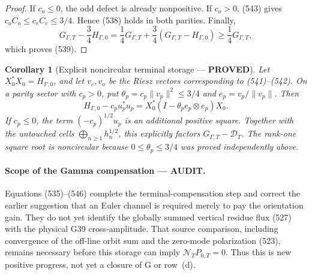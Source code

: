 \documentclass[11pt]{article}
\newtheorem{corollary}[theorem]{Corollary}
\newcommand{\PROVED}{\textcolor{green!45!black}{\textbf{PROVED}}}
\newcommand{\AUDIT}{\textcolor{orange!75!black}{\textbf{AUDIT}}}
\begin{document}
\begin{proof}
If \(c_o\le0\), the odd defect is already nonpositive.  If \(c_o>0\),
(543) gives \(c_oC_o\le c_eC_e\le3/4\).  Hence (538) holds in both
parities.  Finally,
\[
 G_{\Gamma,T}-\frac34H_{\Gamma,0}
 =\frac14G_{\Gamma,T}
  +\frac34(G_{\Gamma,T}-H_{\Gamma,0})
 \ge\frac14G_{\Gamma,T},
\]
which proves (539).
\end{proof}

\begin{corollary}[Explicit noncircular terminal storage --- \PROVED]
Let \(X_0^*X_0=H_{\Gamma,0}\), and let \(v_e,v_o\) be the Riesz vectors
corresponding to (541)--(542).  On a parity sector with \(c_p>0\), put
\(\theta_p=c_p\|v_p\|^2\le3/4\) and \(e_p=v_p/\|v_p\|\).  Then
\begin{equation}
 H_{\Gamma,0}-c_pu_p^*u_p
 =X_0^*(I-\theta_p e_p\otimes e_p)X_0.                \tag{546}
\end{equation}
If \(c_p\le0\), the term \((-c_p)^{1/2}u_p\) is an additional positive
square.  Together with the untouched cells
\(\bigoplus_{n\ge1}h_n^{1/2}\), this explicitly factors
\(G_{\Gamma,T}-\mathcal D_T\).  The rank-one square root is noncircular
because \(0\le\theta_p\le3/4\) was proved independently above.
\end{corollary}

\paragraph{Scope of the Gamma compensation --- \AUDIT.}
Equations (535)--(546) complete the terminal-compensation step and correct
the earlier suggestion that an Euler channel is required merely to pay the
orientation gain.  They do not yet identify the globally summed vertical
residue flux (527) with the physical G39 cross-amplitude.  That source
comparison, including convergence of the off-line orbit sum and the
zero-mode polarization (523), remains necessary before this storage can
imply \(\mathcal N_TP_{0,T}=0\).  Thus this is new positive progress, not
yet a closure of G or row~(d).
\end{document}
